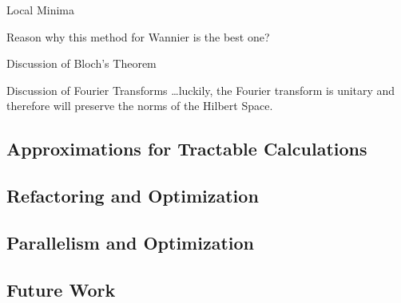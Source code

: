 Local Minima

Reason why this method for Wannier is the best one?

Discussion of Bloch's Theorem

Discussion of Fourier Transforms \ldots{}luckily, the Fourier transform
is unitary and therefore will preserve the norms of the Hilbert Space.

\subsection{Approximations for Tractable
Calculations}\label{approximations-for-tractable-calculations}

\subsection{Refactoring and
Optimization}\label{refactoring-and-optimization}

\subsection{Parallelism and
Optimization}\label{parallelism-and-optimization}

\subsection{Future Work}\label{future-work}
